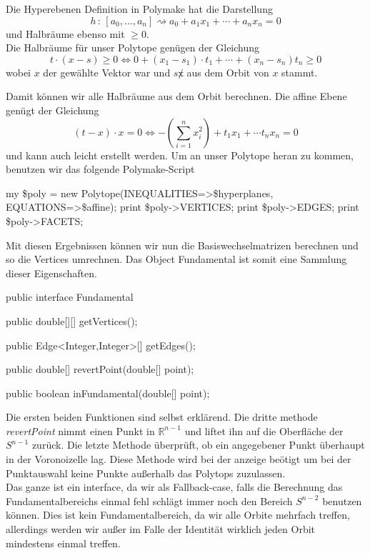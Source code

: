          Die Hyperebenen Definition in Polymake hat die Darstellung
         $$
            h \, : \, [a_0, ..., a_n] \rightsquigarrow a_0 + a_1 x_1 + \cdots + a_n x_n = 0
         $$
         und Halbräume ebenso mit $\geq 0$.\\

         Die Halbräume für unser Polytope genügen der Gleichung
         $$
            t \cdot (x - s) \geq 0 \Leftrightarrow 0 + (x_1-s_1)\cdot t_1 + \cdots + (x_n -s_n)t_n \geq 0
         $$
         wobei $x$ der gewählte Vektor war und $s \not x$ aus dem Orbit von $x$ stammt.

         Damit können wir alle Halbräume aus dem Orbit berechnen. Die affine Ebene genügt der Gleichung
         $$
            (t - x) \cdot x = 0 \Leftrightarrow - \left( \sum_{i=1}^n x_i^2 \right) + t_1 x_1 + \cdots t_n x_n = 0
         $$
         und kann auch leicht erstellt werden. Um an unser Polytope heran zu kommen, benutzen wir das folgende Polymake-Script

         \begin{code}
            my \$poly = new Polytope(INEQUALITIES=>\$hyperplanes, EQUATIONS=>\$affine);
            print \$poly->VERTICES;
            print \$poly->EDGES;
            print \$poly->FACETS;
         \end{code}

         Mit diesen Ergebnissen können wir nun die Basiswechselmatrizen berechnen und so die Vertices umrechnen. Das Object Fundamental ist somit
         eine Sammlung dieser Eigenschaften.

         \begin{code}
            public interface Fundamental {
               public double[][] getVertices();
               
               public Edge<Integer,Integer>[] getEdges();

               public double[] revertPoint(double[] point);

               public boolean inFundamental(double[] point);
            }
         \end{code}
         
         Die ersten beiden Funktionen sind selbst erklärend. Die dritte methode \emph{revertPoint} nimmt einen Punkt in $\mathbb{R}^{n-1}$ und
         liftet ihn auf die Oberfläche der $S^{n-1}$ zurück. Die letzte Methode überprüft, ob ein angegebener Punkt überhaupt in der Voronoizelle lag.
         Diese Methode wird bei der anzeige beötigt um bei der Punktauswahl keine Punkte außerhalb das Polytops zuzulassen.\\

         Das ganze ist ein interface, da wir als Fallback-case, falls die Berechnung das Fundamentalbereichs einmal fehl schlägt immer noch 
         den Bereich $S^{n-2}$ benutzen können. Dies ist kein Fundamentalbereich, da wir alle Orbite mehrfach treffen, allerdings werden wir außer im Falle
         der Identität wirklich jeden Orbit mindestens einmal treffen.
